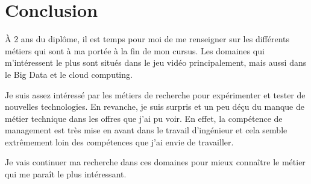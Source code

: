 \documentclass{article}
\begin{document}
    \section{Conclusion}

    À 2 ans du diplôme, il est temps pour moi de me renseigner sur les différents métiers qui sont à ma portée à la fin de mon cursus.
    Les domaines qui m'intéressent le plus sont situés dans le jeu vidéo principalement, mais aussi dans le Big Data et le cloud computing.

    Je suis assez intéressé par les métiers de recherche pour expérimenter et tester de nouvelles technologies.
    En revanche, je suis surpris et un peu déçu du manque de métier technique dans les offres que j'ai pu voir.
    En effet, la compétence de management est très mise en avant dans le travail d'ingénieur et cela semble extrêmement loin des compétences que j'ai envie de travailler.

    Je vais continuer ma recherche dans ces domaines pour mieux connaître le métier qui me paraît le plus intéressant.
\end{document}
